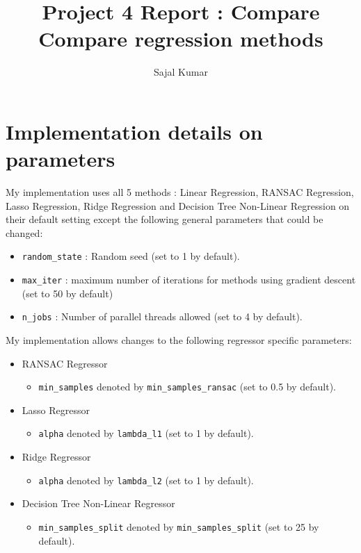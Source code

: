 \documentclass[12pt]{article}
\title{\textbf{Project 4 Report : Compare Compare regression methods}}
\author{Sajal Kumar}
\date{}
\begin{document}
\maketitle

\section*{Implementation details on parameters}

My implementation uses all 5 methods : Linear Regression, RANSAC Regression, Lasso Regression, Ridge Regression and Decision Tree Non-Linear Regression on their default setting except the following general parameters that could be changed:

\begin{itemize}
\item \texttt{random\_state} : Random seed (set to 1 by default).
\item \texttt{max\_iter} : maximum number of iterations for methods using gradient descent (set to 50 by default)
\item \texttt{n\_jobs} : Number of parallel threads allowed (set to 4 by default).
\end{itemize}

My implementation allows changes to the following regressor specific parameters:

\begin{itemize}
\item RANSAC Regressor
\begin{itemize}
\item \texttt{min\_samples} denoted by \texttt{min\_samples\_ransac} (set to 0.5 by default).
\end{itemize}
\item Lasso Regressor
\begin{itemize}
\item \texttt{alpha} denoted by \texttt{lambda\_l1} (set to 1 by default).
\end{itemize}
\item Ridge Regressor
\begin{itemize}
\item \texttt{alpha} denoted by \texttt{lambda\_l2} (set to 1 by default).
\end{itemize}
\item Decision Tree Non-Linear Regressor
\begin{itemize}
\item \texttt{min\_samples\_split} denoted by \texttt{min\_samples\_split} (set to 25 by default).
\end{itemize}
\end{itemize}
\end{document}
